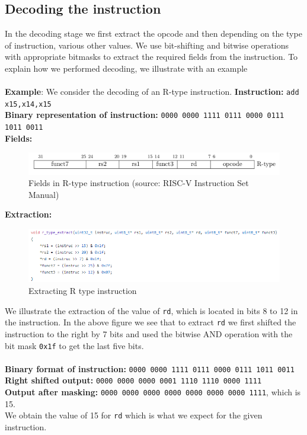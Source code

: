 \subsection{Decoding the instruction}
In the decoding stage we first extract the opcode and then depending on the type of instruction, various other values. We use bit-shifting and bitwise operations with appropriate bitmasks to extract the required fields from the instruction. To explain how we performed decoding, we illustrate with an example\\
\\
\textbf{Example}: We consider the decoding of an R-type instruction.
\newline
\textbf{Instruction:} \texttt{add x15,x14,x15}\\
\textbf{Binary representation of instruction:} \texttt{0000 0000 1111 0111 0000 0111 1011 0011}
\\
\textbf{Fields:}
\begin{figure}[H]
    \centering
    \includegraphics[scale=0.8]{figures/r_type.png}
    \caption{Fields in R-type instruction (source: RISC-V Instruction Set Manual)}
    \label{fig:Fields in R-type instruction}
\end{figure}
\pagebreak
\textbf{Extraction:}
\begin{figure}[H]
    \centering
    \includegraphics[scale=0.9]{figures/r_code.png}
    \caption{Extracting R type instruction}
    \label{fig:Extracting R type instruction}
\end{figure}

We illustrate the extraction of the value of \texttt{rd}, which is located in bits 8 to 12 in the instruction. In the above figure we see that to extract \texttt{rd} we first shifted the instruction to the right by 7 bits and used the bitwise AND operation with the bit mask \texttt{0x1f} to get the last five bits.\\
\\
\textbf{Binary format of instruction:} \texttt{0000 0000 1111 0111 0000 0111 1011 0011}\\
\textbf{Right shifted output:} \texttt{0000 0000 0000 0001 1110 1110 0000 1111}\\
\textbf{Output after masking:} \texttt{0000 0000 0000 0000 0000 0000 0000 1111}, which is 15.\\
We obtain the value of 15 for \texttt{rd} which is what we expect for the given instruction.
\\
\\

